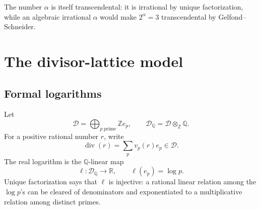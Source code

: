 \documentclass[11pt]{article}
\theoremstyle{definition}
\newcommand{\Q}{\mathbb{Q}}
\newcommand{\R}{\mathbb{R}}
\newcommand{\Z}{\mathbb{Z}}
\newcommand{\divv}{\operatorname{div}}
\newcommand{\calD}{\mathcal D}
\begin{document}
The number \(\alpha\) is itself transcendental: it is irrational by unique factorization, while an algebraic irrational \(\alpha\) would make \(2^\alpha=3\) transcendental by Gelfond--Schneider.

\section{The divisor-lattice model}

\subsection{Formal logarithms}

Let
\[
 \calD=\bigoplus_{p\ \mathrm{prime}}\Z e_p,
 \qquad
 \calD_\Q=\calD\otimes_\Z\Q.
\]
For a positive rational number \(r\), write
\[
 \divv(r)=\sum_p v_p(r)e_p\in\calD.
\]
The real logarithm is the \(\Q\)-linear map
\[
 \ell:\calD_\Q\longrightarrow\R,
 \qquad \ell(e_p)=\log p.
\]
Unique factorization says that \(\ell\) is injective: a rational linear relation among the \(\log p\)'s can be cleared of denominators and exponentiated to a multiplicative relation among distinct primes.
\end{document}
